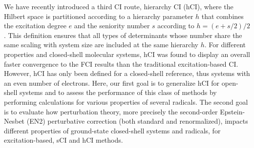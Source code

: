 \documentclass[aip,jcp,reprint,noshowkeys,superscriptaddress]{revtex4-1}
\begin{document}
We have recently introduced a third CI route, hierarchy CI (hCI), \cite{Kossoski_2022}
where the Hilbert space is partitioned according to a hierarchy parameter $h$ that combines the excitation degree $e$ and the seniority number $s$ according to $h = (e+s/2)/2$.
This definition ensures that all types of determinants whose number share the same scaling with system size are included at the same hierarchy $h$.
For different properties and closed-shell molecular systems, 
hCI was found to display an overall faster convergence to the FCI results than the traditional excitation-based CI. \cite{Kossoski_2022}
However, hCI has only been defined for a closed-shell reference, thus systems with an even number of electrons.
Here, our first goal is to generalize hCI for open-shell systems and to assess the performance of this class of methods by performing calculations for various properties of several radicals.
The second goal is to evaluate how perturbation theory, more precisely the second-order Epstein-Nesbet (EN2) perturbative correction (both standard and renormalized), \cite{Garniron_2019}
impacts different properties of ground-state closed-shell systems and radicals, for excitation-based, sCI and hCI methods.
\end{document}
